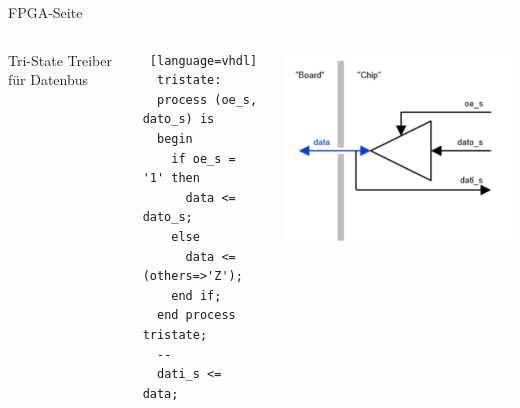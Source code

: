   \begin{frame} [fragile] {FPGA-Seite}
    \begin{columns}
        Tri-State Treiber für Datenbus
        \begin{lstlisting} [language=vhdl]
  tristate:
  process (oe_s, dato_s) is
  begin
    if oe_s = '1' then
      data <= dato_s;
    else
      data <= (others=>'Z');
    end if;
  end process tristate;
  --
  dati_s <= data;
        \end{lstlisting}
        \includegraphics[width=\textwidth]{figs/tristate-treiber.png}
    \end{columns}
  \end{frame}


